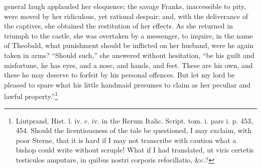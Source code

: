 general laugh applauded her eloquence; the savage Franks, inaccessible to pity, were moved by her ridiculous, yet rational despair; and, with the deliverance of the captives, she obtained the restitution of her effects. As she returned in triumph to the castle, she was overtaken by a messenger, to inquire, in the name of Theobald, what punishment should be inflicted on her husband, were he again taken in arms? \texthebrew{“}Should such,\texthebrew{}” she answered without hesitation, \texthebrew{“}be his guilt and misfortune, he has eyes, and a nose, and hands, and feet. These are his own, and these he may deserve to forfeit by his personal offences. But let my lord be pleased to spare what his little handmaid presumes to claim as her peculiar and lawful property.\texthebrew{}”\footnote{Liutprand, Hist. l. iv. c. iv. in the Rerum Italic. Script. tom. i. pars i. p. 453, 454. Should the licentiousness of the tale be questioned, I may exclaim, with poor Sterne, that it is hard if I may not transcribe with caution what a bishop could write without scruple! What if I had translated, ut viris certetis testiculos amputare, in quibus nostri corporis refocillatio, \&c.?}

